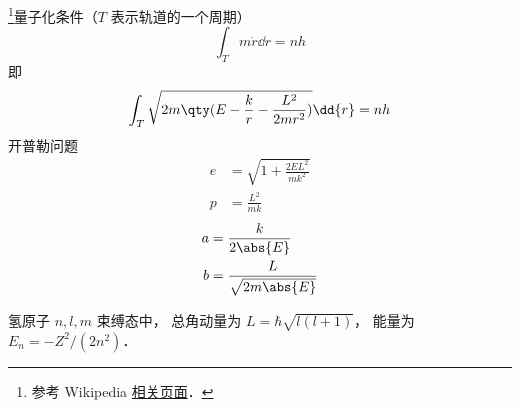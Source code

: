 
\begin{issues}
\issueDraft
\end{issues}

\footnote{参考 Wikipedia \href{https://en.wikipedia.org/wiki/Bohr_model}{相关页面}．}量子化条件（$T$ 表示轨道的一个周期）
\begin{equation}
\int_T m\dot r \dd{r} = nh
\end{equation}
即
\begin{equation}
\int_T \sqrt{2m\qty(E - \frac{k}{r} - \frac{L^2}{2mr^2})} \dd{r} = nh
\end{equation}
开普勒问题
\begin{align}
e &= \sqrt{1 + \frac{2EL^2}{mk^2}}\\
p &= \frac{L^2}{mk}
\end{align}
\begin{align}
a &= \frac{k}{2\abs{E}}\\
b &= \frac{L}{\sqrt{2m\abs{E}}}
\end{align}

氢原子 $n,l,m$ 束缚态中， 总角动量为 $L = \hbar\sqrt{l(l+1)}$， 能量为 $E_n = -Z^2/(2n^2)$．
